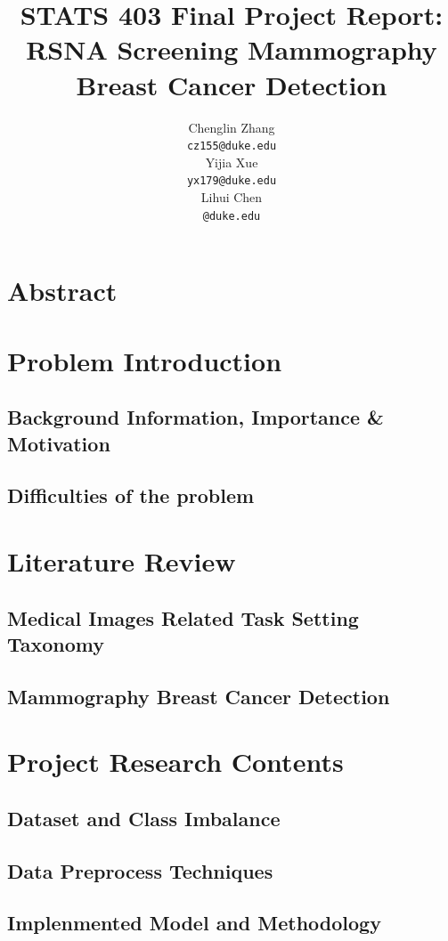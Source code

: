 \documentclass{article}
\title{STATS 403 Final Project Report: RSNA Screening Mammography Breast Cancer Detection}
\author{
\And
  Chenglin Zhang \\
  \texttt{cz155@duke.edu} \\
   \And
  Yijia Xue \\
  \texttt{yx179@duke.edu} \\
   \And
  Lihui Chen\\
  \texttt{@duke.edu} \\
}
\begin{document}
\maketitle
\keywords{ }
\section*{Abstract}


\newpage
\tableofcontents
\newpage
\section{Problem Introduction}
\subsection{Background Information, Importance \& Motivation  }

\subsection{Difficulties of the problem}


\section{Literature Review}
\subsection{Medical Images Related Task Setting Taxonomy}
\subsection{Mammography Breast Cancer Detection}
\section{Project Research Contents}

\subsection{Dataset and Class Imbalance}

\subsection{Data Preprocess Techniques}

\subsection{Implenmented Model and Methodology}
\end{document}
